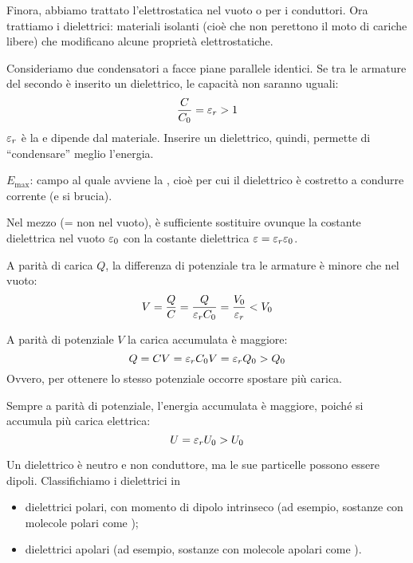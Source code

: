 Finora, abbiamo trattato l'elettrostatica nel vuoto o per i conduttori.
Ora trattiamo i dielettrici: materiali isolanti (cioè che non perettono il moto di cariche libere) che modificano alcune proprietà elettrostatiche.

Consideriamo due condensatori a facce piane parallele identici.
Se tra le armature del secondo è inserito un dielettrico, le capacità non saranno uguali:
\begin{equation}
    \frac{C}{C_0} = \varepsilon_r > 1
\end{equation}
$\varepsilon_r$ è la  e dipende dal materiale.
Inserire un dielettrico, quindi, permette di ``condensare'' meglio l'energia.

 $E_\mathrm{max}$: campo al quale avviene la , cioè per cui il dielettrico è costretto a condurre corrente (e si brucia).

Nel mezzo (= non nel vuoto), è sufficiente sostituire ovunque la costante dielettrica nel vuoto $\varepsilon_0$ con la costante dielettrica $\varepsilon = \varepsilon_r \varepsilon_0$.

A parità di carica $Q$, la differenza di potenziale tra le armature è minore che nel vuoto:
\begin{equation}
    V = \frac{Q}{C} = \frac{Q}{\varepsilon_r C_0} = \frac{V_0}{\varepsilon_r} < V_0
\end{equation}

A parità di potenziale $V$ la carica accumulata è maggiore:
\begin{equation}
    Q = CV = \varepsilon_r C_0 V = \varepsilon_r Q_0 > Q_0
\end{equation}
Ovvero, per ottenere lo stesso potenziale occorre spostare più carica.

Sempre a parità di potenziale, l'energia accumulata è maggiore, poiché si accumula più carica elettrica:
\begin{equation}
    U = \varepsilon_r U_0 > U_0
\end{equation}

Un dielettrico è neutro e non conduttore, ma le sue particelle possono essere dipoli.
Classifichiamo i dielettrici in
\begin{itemize}
    \item dielettrici polari, con momento di dipolo intrinseco (ad esempio, sostanze con molecole polari come );
    \item dielettrici apolari (ad esempio, sostanze con molecole apolari come ).
\end{itemize}

